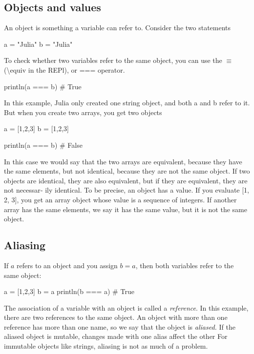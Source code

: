 \documentclass{report}
\begin{document}
    \bigbreak \noindent 
    \subsection{Objects and values}
    \bigbreak \noindent 
    An object is something a variable can refer to. Consider the two statements
    \bigbreak \noindent 
    \begin{jlcode}
    a = "Julia"
    b = "Julia"
    \end{jlcode}
    \bigbreak \noindent 
    To check whether two variables refer to the same object, you can use the $\equiv$ (\textbackslash equiv in the REPl), or === operator.
    \bigbreak \noindent 
    \begin{jlcode}
    println(a === b) # True
    \end{jlcode}
    \bigbreak \noindent 
    In this example, Julia only created one string object, and both a and b refer to it. But when you create two arrays, you get two objects
    \bigbreak \noindent 
    \begin{jlcode}
        a = [1,2,3]
        b = [1,2,3]

        println(a === b) # False
    \end{jlcode}
    \bigbreak \noindent 
    In this case we would say that the two arrays are equivalent, because they have the same elements, but not identical, because they are not the same object. If two objects are identical, they are also equivalent, but if they are equivalent, they are not necessar‐ ily identical.
    \bigbreak \noindent 
    To be precise, an object has a value. If you evaluate [1, 2, 3], you get an array object whose value is a sequence of integers. If another array has the same elements, we say it has the same value, but it is not the same object.

    \bigbreak \noindent 
    \subsection{Aliasing}
    \bigbreak \noindent 
    If $a$ refers to an object and you assign $b = a$, then both variables refer to the same object:
    \bigbreak \noindent 
    \begin{jlcode}
        a = [1,2,3]
        b = a
        println(b === a) # True
    \end{jlcode}
    \bigbreak \noindent 
    The association of a variable with an object is called a \textit{reference}. In this example, there are two references to the same object.
    \bigbreak \noindent 
    An object with more than one reference has more than one name, so we say that the object is \textit{aliased.}
    \bigbreak \noindent 
    If the aliased object is mutable, changes made with one alias affect the other
    \bigbreak \noindent 
    For immutable objects like strings, aliasing is not as much of a problem.
\end{document}
